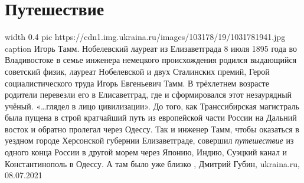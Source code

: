 
 
 
 
 
\chapter{Путешествие}
\label{sec:slova.puteshestvie}

\ifcmt
	width 0.4
  pic https://cdn1.img.ukraina.ru/images/103178/19/1031781941.jpg
	caption Игорь Тамм. Нобелевский лауреат из Елизаветграда
\fi
8 июля 1895 года во Владивостоке в семье инженера немецкого происхождения
родился выдающийся советский физик, лауреат Нобелевской и двух Сталинских
премий, Герой социалистического труда Игорь Евгеньевич Тамм. В трёхлетнем
возрасте родители перевезли его в Елисаветград, где и сформировался этот
незаурядный учёный.  «…глядел в лицо цивилизации».  До того, как Транссибирская
магистраль была пущена в строй кратчайший путь из европейской части России на
Дальний восток и обратно пролегал через Одессу. Так и инженер Тамм, чтобы
оказаться в уездном городе Херсонской губернии Елизаветграде, совершил
\emph{путешествие} из одного конца России в другой морем через Японию, Индию,
Суэцкий канал и Константинополь в Одессу. А там было уже близко
, Дмитрий Губин, ukraina.ru, 08.07.2021

